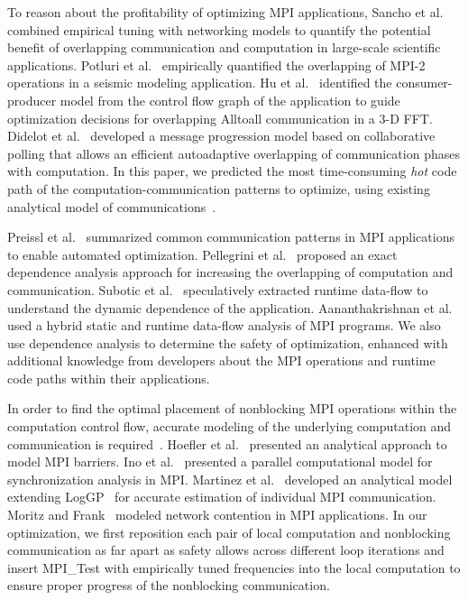 To reason about the profitability of optimizing MPI applications,
Sancho et al.~\cite{sancho:sc06} combined empirical tuning with
networking models to quantify the potential benefit of overlapping
communication and computation in large-scale scientific applications.
Potluri et al.~\cite{potluri:ics10} empirically quantified the
overlapping of MPI-2 operations in a seismic modeling application.  Hu
et al.~\cite{hu:npc08,song:ppopp14} identified the consumer-producer
model from the control flow graph of the application to guide
optimization decisions for overlapping Alltoall communication in a 3-D
FFT.  Didelot et al.~\cite{didelot:imc14,didelot:eurompi12} developed
a message progression model based on collaborative polling that allows
an efficient autoadaptive overlapping of communication phases with
computation.  In this paper, we predicted the most time-consuming
\emph{hot} code path of the computation-communication patterns to
optimize, using existing analytical model of
communications~\cite{loggp}.

Preissl et al.~\cite{preissl:tms10} summarized common communication
patterns in MPI applications to enable automated optimization.
Pellegrini et al.~\cite{pellegrini:eurompi12} proposed an exact
dependence analysis approach for increasing the overlapping of
computation and communication.  Subotic et al.~\cite{subotic:hipeac08}
speculatively extracted runtime data-flow to understand the dynamic
dependence of the application.  Aananthakrishnan et
al.~\cite{aananthakrishnan:ics13} used a hybrid static and runtime
data-flow analysis of MPI programs.  We also use dependence analysis
to determine the safety of optimization, enhanced with additional
knowledge from developers about the MPI operations and runtime code
paths within their applications.

In order to find the optimal placement of nonblocking MPI operations
within the computation control flow, accurate modeling of the
underlying computation and communication is
required~\cite{brightwell:ics04}.  Hoefler et
al.~\cite{hoefler:icppw05} presented an analytical approach to model
MPI barriers.  Ino et al.~\cite{ino:ppopp2001} presented a parallel
computational model for synchronization analysis in MPI.  Martinez et
al.~\cite{martinez:ipdps09} developed an analytical model extending
LogGP~\cite{loggp} for accurate estimation of individual MPI
communication.  Moritz and Frank~\cite{moritz:tpds01} modeled network
contention in MPI applications.  In our optimization, we first
reposition each pair of local computation and nonblocking
communication as far apart as safety allows across different loop
iterations and insert MPI\_Test with empirically tuned frequencies
into the local computation to ensure proper progress of the
nonblocking communication.
